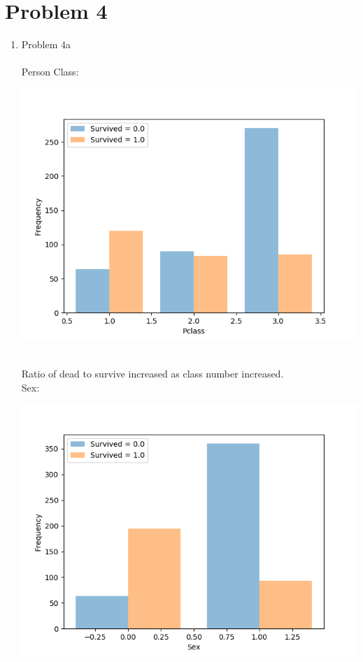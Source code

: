 \documentclass[11pt]{article}
\newcommand{\solution}[1]{{{\color{blue}{\bf Solution:} {#1}}}}
\begin{document}
\section{Problem 4}
\begin{enumerate}
\item Problem 4a \\
\solution{} \\
Person Class: \\
\centerline{\includegraphics[scale=0.5]{1}} \\
Ratio of dead to survive increased as class number increased. \\ 
Sex: \\
\centerline{\includegraphics[scale=0.5]{2}} \\ 

\end{enumerate}
\end{document}
